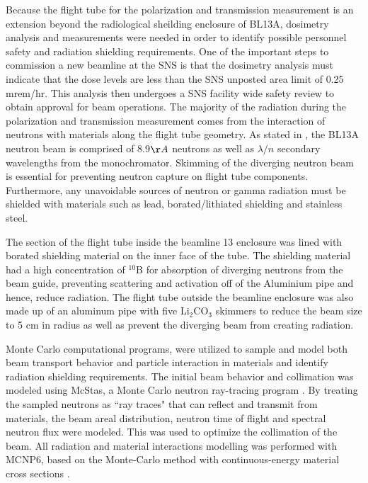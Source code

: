 Because the flight tube for the polarization and transmission measurement is an extension beyond the radiological sheilding enclosure of BL13A, dosimetry analysis and measurements were needed in order to identify possible personnel safety and radiation shielding requirements. One of the important steps to commission a new beamline at the SNS is that the dosimetry analysis must indicate that the dose levels are less than the SNS unposted area limit of 0.25 mrem/hr. This analysis then undergoes a SNS facility wide safety review to obtain approval for beam operations. The majority of the radiation during the polarization and transmission measurement comes from the interaction of neutrons with materials along the flight tube geometry. As stated in \cite{Fomin2015}, the BL13A neutron beam is comprised of 8.9$\AA$ neutrons as well as $\lambda/n$ secondary wavelengths from the monochromator. Skimming of the diverging neutron beam is essential for preventing neutron capture on flight tube components. Furthermore, any unavoidable sources of neutron or gamma radiation must be shielded with materials such as lead, borated/lithiated shielding and stainless steel.

The section of the flight tube inside the beamline 13 enclosure was lined with borated shielding material on the inner face of the tube. The shielding material had a high concentration of $^{10}$B for absorption of diverging neutrons from the beam guide, preventing scattering and activation off of the Aluminium pipe and hence, reduce radiation. The flight tube outside the beamline enclosure was also made up of an aluminum pipe with five Li$_2$CO$_3$ skimmers to reduce the beam size to 5 cm in radius as well as prevent the diverging beam from creating radiation.

Monte Carlo computational programs, were utilized to sample and model both beam transport behavior and particle interaction in materials and identify radiation shielding requirements. The initial beam behavior and collimation was modeled using McStas, a Monte Carlo neutron ray-tracing program \cite{Willendrup2020}. By treating the sampled neutrons as ``ray traces" that can reflect and transmit from materials, the beam areal distribution, neutron time of flight and spectral neutron flux were modeled. This was used to optimize the collimation of the beam. All radiation and material interactions modelling was performed with MCNP6, based on the Monte-Carlo method with continuous-energy material cross sections \cite{Goorley2012}. 

